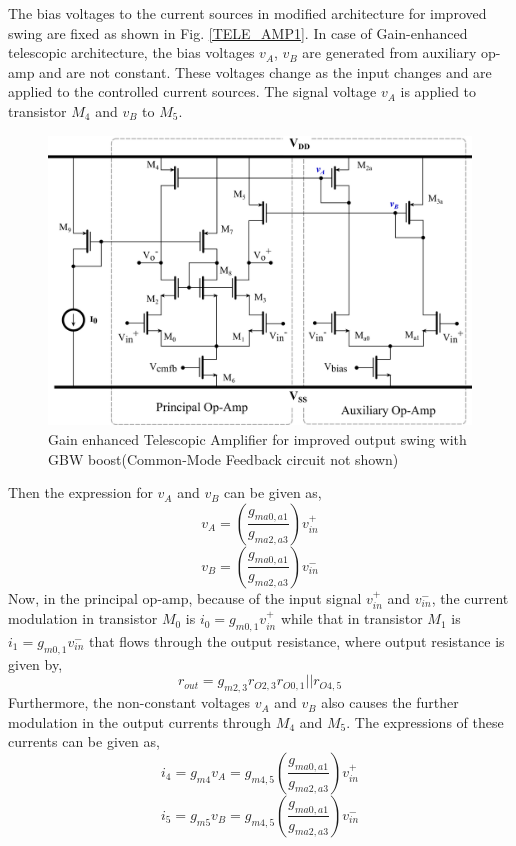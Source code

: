 The bias voltages to the current sources in modified architecture for improved swing are fixed as shown in Fig. \ref{TELE_AMP1}. In case of Gain-enhanced telescopic architecture, the bias voltages $v_A$, $v_B$ are generated from auxiliary op-amp and are not constant. These voltages change as the input changes and are applied to the controlled current sources. The signal voltage $v_A$ is applied to transistor $M_4$ and $v_B$ to $M_5$.

\begin{figure}[ht]
\centering
\includegraphics[width=\columnwidth]{Chap05/Figures/gain_enhanced_telescopic.png}
\caption{Gain enhanced Telescopic Amplifier for improved output swing with GBW boost(Common-Mode Feedback circuit not shown)}
\label{fig:GIN_ENH_TELE_AMP}
\end{figure}

Then the expression for $v_A$ and $v_B$ can be given as,
%
\begin{equation}
    v_A = \left(\frac{g_{ma0,a1}}{g_{ma2,a3}}\right) v_{in}^+
\end{equation}
%
%
\begin{equation}
    v_B = \left(\frac{g_{ma0,a1}}{g_{ma2,a3}}\right) v_{in}^-
\end{equation}
%
Now, in the principal op-amp, because of the input signal $v_{in}^+$ and $v_{in}^-$, the current modulation in transistor $M_0$ is $i_0=g_{m0,1}v_{in}^+$ while that in transistor $M_1$ is $i_1=g_{m0,1}v_{in}^-$ that flows through the output resistance, where output resistance is given by,
%
\begin{equation}
    r_{out} = g_{m2,3}r_{O2,3}r_{O0,1}||r_{O4,5}
\end{equation}
%
Furthermore, the non-constant voltages $v_A$ and $v_B$ also causes the further modulation in the output currents through $M_4$ and $M_5$. The expressions of these currents can be given as,
%
\begin{equation}
    i_4 = g_{m4}v_A = g_{m4,5}\left(\frac{g_{ma0,a1}}{g_{ma2,a3}}\right) v_{in}^+
\end{equation}
%
%
\begin{equation}
    i_5 = g_{m5}v_B = g_{m4,5}\left(\frac{g_{ma0,a1}}{g_{ma2,a3}}\right) v_{in}^-
\end{equation}
%

